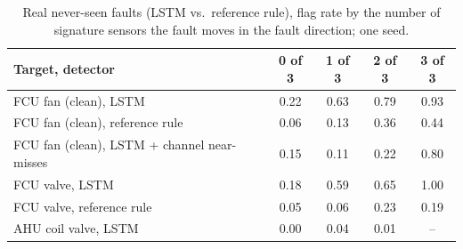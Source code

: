\begin{table}[h]\centering\small
\caption{Real never-seen faults (LSTM vs.\ reference rule), flag rate by the number of signature sensors the fault moves in the fault direction; one seed.}\label{tab:realov}
\setlength{\tabcolsep}{4pt}
\begin{tabular}{lcccc}
\toprule
Target, detector & 0 of 3 & 1 of 3 & 2 of 3 & 3 of 3\\
\midrule
FCU fan (clean), LSTM & 0.22 & 0.63 & 0.79 & 0.93\\
FCU fan (clean), reference rule & 0.06 & 0.13 & 0.36 & 0.44\\
FCU fan (clean), LSTM + channel near-misses & 0.15 & 0.11 & 0.22 & 0.80\\
FCU valve, LSTM & 0.18 & 0.59 & 0.65 & 1.00\\
FCU valve, reference rule & 0.05 & 0.06 & 0.23 & 0.19\\
AHU coil valve, LSTM & 0.00 & 0.04 & 0.01 & --\\
\bottomrule
\end{tabular}
\end{table}

